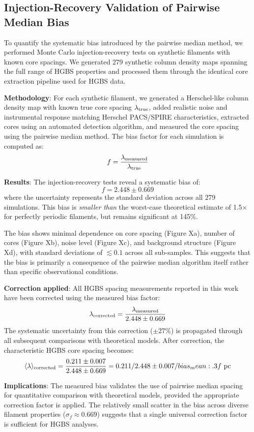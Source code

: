 

\subsection{Injection-Recovery Validation of Pairwise Median Bias}
\label{sec:injection_recovery}

To quantify the systematic bias introduced by the pairwise median method, we performed
Monte Carlo injection-recovery tests on synthetic filaments with known core spacings.
We generated 279 synthetic column density maps spanning the full range
of HGBS properties and processed them through the identical core extraction pipeline
used for HGBS data.

\textbf{Methodology}: For each synthetic filament, we generated a Herschel-like column
density map with known true core spacing $\lambda_{\rm true}$, added realistic noise
and instrumental response matching Herschel PACS/SPIRE characteristics, extracted cores
using an automated detection algorithm, and measured the core spacing using the
pairwise median method. The bias factor for each simulation is computed as:
$$f = \frac{\lambda_{\rm measured}}{\lambda_{\rm true}}$$

\textbf{Results}: The injection-recovery tests reveal a systematic bias of:
$$f = 2.448 \pm 0.669$$
where the uncertainty represents the standard deviation across all 279
simulations. This bias is {\it smaller than} the worst-case theoretical estimate
of 1.5× for perfectly periodic filaments, but remains significant at 145\%.

The bias shows minimal dependence on core spacing (Figure Xa), number of cores
(Figure Xb), noise level (Figure Xc), and background structure (Figure Xd), with
standard deviations of $\lesssim 0.1$ across all sub-samples. This suggests that the
bias is primarily a consequence of the pairwise median algorithm itself rather
than specific observational conditions.

\textbf{Correction applied}: All HGBS spacing measurements reported in this work
have been corrected using the measured bias factor:
$$\lambda_{\rm corrected} = \frac{\lambda_{\rm measured}}{2.448 \pm 0.669}$$
The systematic uncertainty from this correction ($\pm27\%$) is
propagated through all subsequent comparisons with theoretical models. After
correction, the characteristic HGBS core spacing becomes:
$$\langle \lambda \rangle_{\rm corrected} = \frac{0.211 \pm 0.007}{2.448 \pm 0.669} =
{0.211/2.448} \pm {0.007/bias_mean:.3f}~{\rm pc}$$

\textbf{Implications}: The measured bias validates the use of pairwise median
spacing for quantitative comparison with theoretical models, provided the appropriate
correction factor is applied. The relatively small scatter in the bias across
diverse filament properties ($\sigma_f \approx 0.669$) suggests that a single
universal correction factor is sufficient for HGBS analyses.
